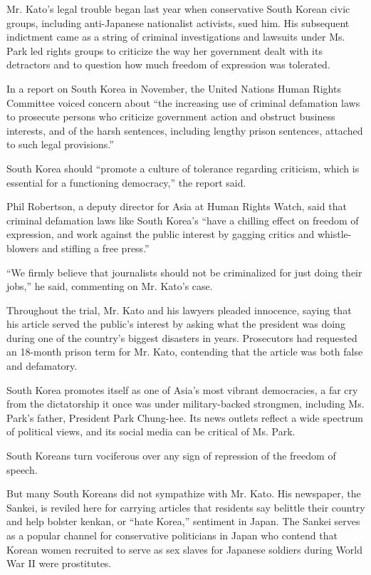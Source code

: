 Mr. Kato's legal trouble began last year when conservative South Korean
civic groups, including anti-Japanese nationalist activists, sued him.
His subsequent indictment came as a string of criminal investigations
and lawsuits under Ms. Park led rights groups to criticize the way her
government dealt with its detractors and to question how much freedom of
expression was tolerated.

In a report on South Korea in November, the United Nations Human Rights
Committee voiced concern about ``the increasing use of criminal
defamation laws to prosecute persons who criticize government action and
obstruct business interests, and of the harsh sentences, including
lengthy prison sentences, attached to such legal provisions.''

South Korea should ``promote a culture of tolerance regarding criticism,
which is essential for a functioning democracy,'' the report said.

Phil Robertson, a deputy director for Asia at Human Rights Watch, said
that criminal defamation laws like South Korea's ``have a chilling
effect on freedom of expression, and work against the public interest by
gagging critics and whistle-blowers and stifling a free press.''

``We firmly believe that journalists should not be criminalized for just
doing their jobs,'' he said, commenting on Mr. Kato's case.

Throughout the trial, Mr. Kato and his lawyers pleaded innocence, saying
that his article served the public's interest by asking what the
president was doing during one of the country's biggest disasters in
years. Prosecutors had requested an 18-month prison term for Mr. Kato,
contending that the article was both false and defamatory.

South Korea promotes itself as one of Asia's most vibrant democracies, a
far cry from the dictatorship it once was under military-backed
strongmen, including Ms. Park's father, President Park Chung-hee. Its
news outlets reflect a wide spectrum of political views, and its social
media can be critical of Ms. Park.

South Koreans turn vociferous over any sign of repression of the freedom
of speech.

But many South Koreans did not sympathize with Mr. Kato. His newspaper,
the Sankei, is reviled here for carrying articles that residents say
belittle their country and help bolster kenkan, or ``hate Korea,''
sentiment in Japan. The Sankei serves as a popular channel for
conservative politicians in Japan who contend that Korean women
recruited to serve as sex slaves for Japanese soldiers during World War
II were prostitutes.

